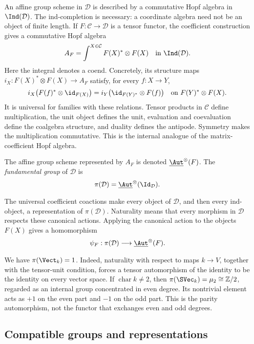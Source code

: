 An affine group scheme in $\mathcal D$ is described by a commutative Hopf
algebra in $\Ind(\mathcal D)$. The ind-completion is necessary: a coordinate
algebra need not be an object of finite length. If $F:\mathcal C\to\mathcal D$
is a tensor functor, the coefficient construction gives a commutative Hopf
algebra
\[
 A_F=\int^{X\in\mathcal C}F(X)^*\otimes F(X)
       \quad\text{in }\Ind(\mathcal D).
\]
Here the integral denotes a coend. Concretely, its structure maps
$i_X:F(X)^*\otimes F(X)\to A_F$ satisfy, for every $f:X\to Y$,
\[
 i_X\bigl(F(f)^*\otimes\id_{F(X)}\bigr)
 =i_Y\bigl(\id_{F(Y)^*}\otimes F(f)\bigr)
 \quad\text{on }F(Y)^*\otimes F(X).
\]
It is universal for families with these relations. Tensor products in
$\mathcal C$ define multiplication, the unit object defines the unit,
evaluation and coevaluation define the coalgebra structure, and duality
defines the antipode. Symmetry makes the multiplication commutative.
This is the internal analogue of the matrix-coefficient Hopf algebra.

\begin{definition}
The affine group scheme represented by $A_F$ is denoted
$\underline{\Aut}^{\otimes}(F)$. The \emph{fundamental group} of
$\mathcal D$ is
\[
 \pi(\mathcal D)=\underline{\Aut}^{\otimes}(\Id_{\mathcal D}).
\]
\end{definition}

The universal coefficient coactions make every object of $\mathcal D$, and
then every ind-object, a representation of $\pi(\mathcal D)$. Naturality
means that every morphism in $\mathcal D$ respects these canonical actions.
Applying the canonical action to the objects $F(X)$ gives a homomorphism
\[
 \psi_F:\pi(\mathcal D)\longrightarrow
             \underline{\Aut}^{\otimes}(F).
\]

\begin{example}
We have $\pi(\Vect_k)=1$. Indeed, naturality with respect to maps
$k\to V$, together with the tensor-unit condition, forces a tensor
automorphism of the identity to be the identity on every vector space.
If $\operatorname{char}k\ne2$, then
$\pi(\SVec_k)=\mu_2\cong\mathbb Z/2$, regarded as an internal group
concentrated in even degree. Its nontrivial element acts as $+1$ on the
even part and $-1$ on the odd part. This is the parity automorphism,
not the functor that exchanges even and odd degrees.
\end{example}

\subsection{Compatible groups and representations}


